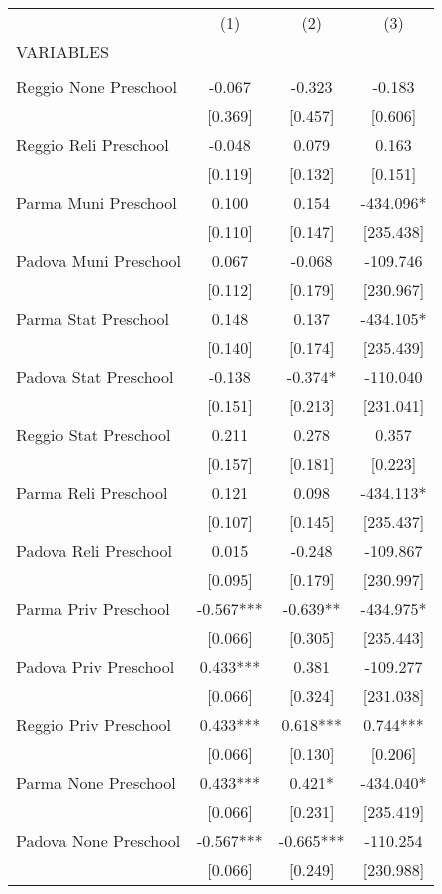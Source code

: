 \begin{tabular}{lccc} \hline
 & (1) & (2) & (3) \\
VARIABLES &  &  &  \\ \hline
 &  &  &  \\
Reggio None Preschool & -0.067 & -0.323 & -0.183 \\
 & [0.369] & [0.457] & [0.606] \\
Reggio Reli Preschool & -0.048 & 0.079 & 0.163 \\
 & [0.119] & [0.132] & [0.151] \\
Parma Muni Preschool & 0.100 & 0.154 & -434.096* \\
 & [0.110] & [0.147] & [235.438] \\
Padova Muni Preschool & 0.067 & -0.068 & -109.746 \\
 & [0.112] & [0.179] & [230.967] \\
Parma Stat Preschool & 0.148 & 0.137 & -434.105* \\
 & [0.140] & [0.174] & [235.439] \\
Padova Stat Preschool & -0.138 & -0.374* & -110.040 \\
 & [0.151] & [0.213] & [231.041] \\
Reggio Stat Preschool & 0.211 & 0.278 & 0.357 \\
 & [0.157] & [0.181] & [0.223] \\
Parma Reli Preschool & 0.121 & 0.098 & -434.113* \\
 & [0.107] & [0.145] & [235.437] \\
Padova Reli Preschool & 0.015 & -0.248 & -109.867 \\
 & [0.095] & [0.179] & [230.997] \\
Parma Priv Preschool & -0.567*** & -0.639** & -434.975* \\
 & [0.066] & [0.305] & [235.443] \\
Padova Priv Preschool & 0.433*** & 0.381 & -109.277 \\
 & [0.066] & [0.324] & [231.038] \\
Reggio Priv Preschool & 0.433*** & 0.618*** & 0.744*** \\
 & [0.066] & [0.130] & [0.206] \\
Parma None Preschool & 0.433*** & 0.421* & -434.040* \\
 & [0.066] & [0.231] & [235.419] \\
Padova None Preschool & -0.567*** & -0.665*** & -110.254 \\
 & [0.066] & [0.249] & [230.988] \\

\end{tabular}
